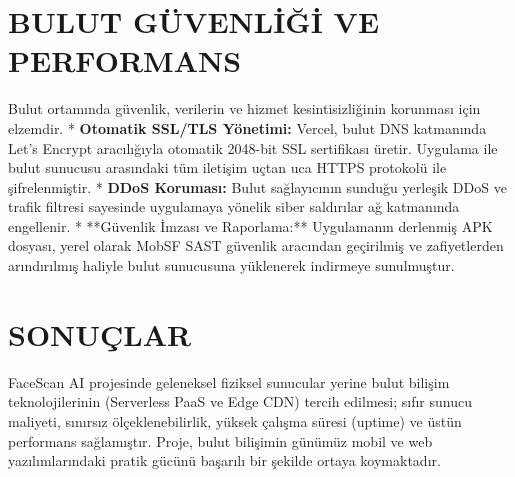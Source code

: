 \documentclass[12pt,a4paper]{article}
\begin{document}
\section{BULUT GÜVENLİĞİ VE PERFORMANS}
Bulut ortamında güvenlik, verilerin ve hizmet kesintisizliğinin korunması için elzemdir.
* \textbf{Otomatik SSL/TLS Yönetimi:} Vercel, bulut DNS katmanında Let's Encrypt aracılığıyla otomatik 2048-bit SSL sertifikası üretir. Uygulama ile bulut sunucusu arasındaki tüm iletişim uçtan uca HTTPS protokolü ile şifrelenmiştir.
* \textbf{DDoS Koruması:} Bulut sağlayıcının sunduğu yerleşik DDoS ve trafik filtresi sayesinde uygulamaya yönelik siber saldırılar ağ katmanında engellenir.
* **Güvenlik İmzası ve Raporlama:** Uygulamanın derlenmiş APK dosyası, yerel olarak MobSF SAST güvenlik aracından geçirilmiş ve zafiyetlerden arındırılmış haliyle bulut sunucusuna yüklenerek indirmeye sunulmuştur.

\section{SONUÇLAR}
FaceScan AI projesinde geleneksel fiziksel sunucular yerine bulut bilişim teknolojilerinin (Serverless PaaS ve Edge CDN) tercih edilmesi; sıfır sunucu maliyeti, sınırsız ölçeklenebilirlik, yüksek çalışma süresi (uptime) ve üstün performans sağlamıştır. Proje, bulut bilişimin günümüz mobil ve web yazılımlarındaki pratik gücünü başarılı bir şekilde ortaya koymaktadır.
\end{document}
